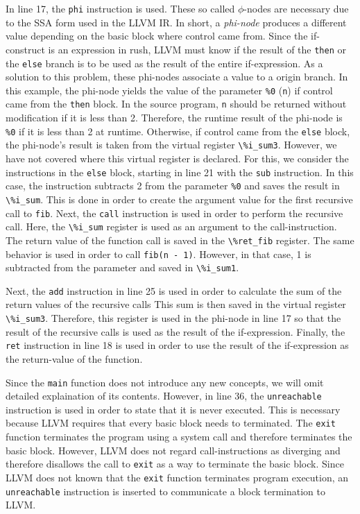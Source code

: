 In line 17, the \texttt{phi} instruction is used.
These so called $\phi$-nodes are necessary due to the SSA form used in the LLVM IR.
In short, a \emph{phi-node} produces a different value depending on the basic block where control came from.
Since the if-construct is an expression in rush, LLVM must know if the result of the \texttt{then} or the \texttt{else} branch is to be used as the result of the entire if-expression.
As a solution to this problem, these phi-nodes associate a value to a origin branch.
In this example, the phi-node yields the value of the parameter \texttt{\%0} (\texttt{n}) if control came from the \texttt{then} block.
In the source program, \texttt{n} should be returned without modification if it is less than 2.
Therefore, the runtime result of the phi-node is \texttt{\%0} if it is less than 2 at runtime.
Otherwise, if control came from the \texttt{else} block, the phi-node's result is taken from the virtual register \Verb|\%i_sum3|.
However, we have not covered where this virtual register is declared.
For this, we consider the instructions in the \texttt{else} block, starting in line 21 with the \texttt{sub} instruction.
In this case, the instruction subtracts 2 from the parameter \texttt{\%0} and saves the result in \Verb|\%i_sum|.
This is done in order to create the argument value for the first recursive call to \texttt{fib}.
Next, the \texttt{call} instruction is used in order to perform the recursive call.
Here, the \Verb|\%i_sum| register is used as an argument to the call-instruction.
The return value of the function call is saved in the \Verb|\%ret_fib| register.
The same behavior is used in order to call \texttt{fib(n - 1)}.
However, in that case, 1 is subtracted from the parameter and saved in \Verb|\%i_sum1|.

Next, the \texttt{add} instruction in line 25 is used in order to calculate the sum of the return values of the recursive calls
This sum is then saved in the virtual register \Verb|\%i_sum3|.
Therefore, this register is used in the phi-node in line 17 so that the result of the recursive calls is used as the result of the if-expression.
Finally, the \texttt{ret} instruction in line 18 is used in order to use the result of the if-expression as the return-value of the function.

Since the \texttt{main} function does not introduce any new concepts, we will omit detailed explaination of its contents.
However, in line 36, the \texttt{unreachable} instruction is used in order to state that it is never executed.
This is necessary because LLVM requires that every basic block needs to terminated.
The \texttt{exit} function terminates the program using a system call and therefore terminates the basic block.
However, LLVM does not regard call-instructions as diverging and therefore disallows the call to \texttt{exit} as a way to terminate the basic block.
Since LLVM does not known that the \texttt{exit} function terminates program execution, an \texttt{unreachable}  instruction is inserted to communicate a block termination to LLVM.

